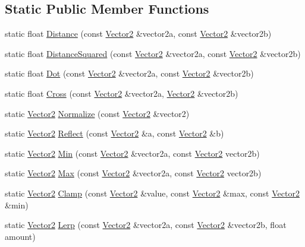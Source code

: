\subsection*{Static Public Member Functions}
\begin{DoxyCompactItemize}
\item 
static float \hyperlink{structVector2_a39d6d5a11de4aae7a83e9427199ef6c2}{Distance} (const \hyperlink{structVector2}{Vector2} \&vector2a, const \hyperlink{structVector2}{Vector2} \&vector2b)
\item 
static float \hyperlink{structVector2_a6d444c3b9e9c910baef36631a29b74a1}{Distance\+Squared} (const \hyperlink{structVector2}{Vector2} \&vector2a, const \hyperlink{structVector2}{Vector2} \&vector2b)
\item 
static float \hyperlink{structVector2_a7e00cb409fcc5b7a2b6413f60560d7b6}{Dot} (const \hyperlink{structVector2}{Vector2} \&vector2a, const \hyperlink{structVector2}{Vector2} \&vector2b)
\item 
static float \hyperlink{structVector2_a40d05adae410e04f5f1309880140284f}{Cross} (const \hyperlink{structVector2}{Vector2} \&vector2a, \hyperlink{structVector2}{Vector2} \&vector2b)
\item 
static \hyperlink{structVector2}{Vector2} \hyperlink{structVector2_aa1cae4abb133f61b3378392a39b43bec}{Normalize} (const \hyperlink{structVector2}{Vector2} \&vector2)
\item 
static \hyperlink{structVector2}{Vector2} \hyperlink{structVector2_afb6a78234fd9053d9e26484615c1ddf5}{Reflect} (const \hyperlink{structVector2}{Vector2} \&a, const \hyperlink{structVector2}{Vector2} \&b)
\item 
static \hyperlink{structVector2}{Vector2} \hyperlink{structVector2_a22f5fa049e36cbb6da68c2b8cc7db5cd}{Min} (const \hyperlink{structVector2}{Vector2} \&vector2a, const \hyperlink{structVector2}{Vector2} vector2b)
\item 
static \hyperlink{structVector2}{Vector2} \hyperlink{structVector2_abdb5a914f07c4aa760832909a2359668}{Max} (const \hyperlink{structVector2}{Vector2} \&vector2a, const \hyperlink{structVector2}{Vector2} vector2b)
\item 
static \hyperlink{structVector2}{Vector2} \hyperlink{structVector2_a251c5b42d6c0cc70001ecd4235d6f466}{Clamp} (const \hyperlink{structVector2}{Vector2} \&value, const \hyperlink{structVector2}{Vector2} \&max, const \hyperlink{structVector2}{Vector2} \&min)
\item 
static \hyperlink{structVector2}{Vector2} \hyperlink{structVector2_acaf1ed1324308802b3a5f7b96c39d33c}{Lerp} (const \hyperlink{structVector2}{Vector2} \&vector2a, const \hyperlink{structVector2}{Vector2} \&vector2b, float amount)
\end{DoxyCompactItemize}
